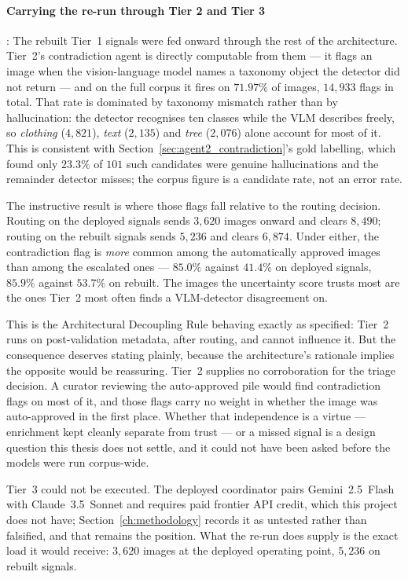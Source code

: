 \documentclass[12pt,a4paper]{report}
\begin{document}
\begin{enumerate}
\paragraph{Carrying the re-run through Tier 2 and Tier 3}: The rebuilt Tier~1 signals were fed
onward through the rest of the architecture. Tier~2's contradiction agent is directly computable
from them --- it flags an image when the vision-language model names a taxonomy object the detector
did not return --- and on the full corpus it fires on $71.97\%$ of images, $14{,}933$ flags in
total. That rate is dominated by taxonomy mismatch rather than by hallucination: the detector
recognises ten classes while the VLM describes freely, so \emph{clothing} ($4{,}821$), \emph{text}
($2{,}135$) and \emph{tree} ($2{,}076$) alone account for most of it. This is consistent with
Section~\ref{sec:agent2_contradiction}'s gold labelling, which found only $23.3\%$ of $101$ such
candidates were genuine hallucinations and the remainder detector misses; the corpus figure is a
candidate rate, not an error rate.

The instructive result is where those flags fall relative to the routing decision. Routing on the
deployed signals sends $3{,}620$ images onward and clears $8{,}490$; routing on the rebuilt signals
sends $5{,}236$ and clears $6{,}874$. Under either, the contradiction flag is \emph{more} common
among the automatically approved images than among the escalated ones --- $85.0\%$ against $41.4\%$
on deployed signals, $85.9\%$ against $53.7\%$ on rebuilt. The images the uncertainty score trusts
most are the ones Tier~2 most often finds a VLM-detector disagreement on.

This is the Architectural Decoupling Rule behaving exactly as specified: Tier~2 runs on
post-validation metadata, after routing, and cannot influence it. But the consequence deserves
stating plainly, because the architecture's rationale implies the opposite would be reassuring.
Tier~2 supplies no corroboration for the triage decision. A curator reviewing the auto-approved
pile would find contradiction flags on most of it, and those flags carry no weight in whether the
image was auto-approved in the first place. Whether that independence is a virtue --- enrichment
kept cleanly separate from trust --- or a missed signal is a design question this thesis does not
settle, and it could not have been asked before the models were run corpus-wide.

Tier~3 could not be executed. The deployed coordinator pairs Gemini~2.5~Flash with
Claude~3.5~Sonnet and requires paid frontier API credit, which this project does not have;
Section~\ref{ch:methodology} records it as untested rather than falsified, and that remains the
position. What the re-run does supply is the exact load it would receive: $3{,}620$ images at the
deployed operating point, $5{,}236$ on rebuilt signals. 


\end{enumerate}
\end{document}
